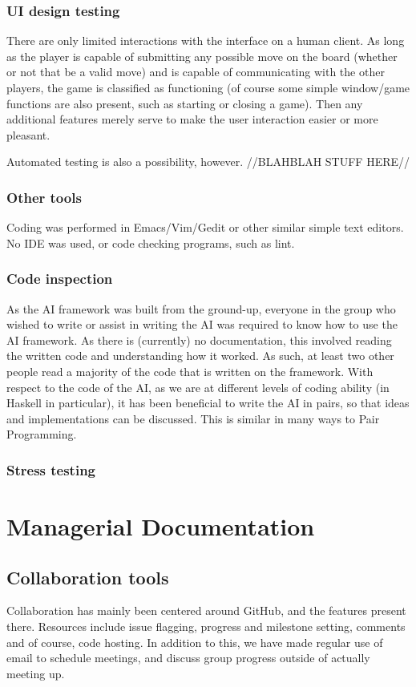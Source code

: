 \documentclass[12pt]{article}
\begin{document}
\subsubsection{UI design testing}
There are only limited interactions with the interface on a human client. As long as the player is capable of submitting any possible move on the board (whether or not that be a valid move) and is capable of communicating with the other players, the game is classified as functioning (of course some simple window/game functions are also present, such as starting or closing a game). Then any additional features merely serve to make the user interaction easier or more pleasant.

Automated testing is also a possibility, however. //BLAHBLAH STUFF HERE//

\subsubsection{Other tools}
Coding was performed in Emacs/Vim/Gedit or other similar simple text editors. No IDE was used, or code checking programs, such as lint.

\subsubsection{Code inspection}
As the AI framework was built from the ground-up, everyone in the group who wished to write or assist in writing the AI was required to know how to use the AI framework. As there is (currently) no documentation, this involved reading the written code and understanding how it worked. As such, at least two other people read a majority of the code that is written on the framework. With respect to the code of the AI, as we are at different levels of coding ability (in Haskell in particular), it has been beneficial to write the AI in pairs, so that ideas and implementations can be discussed. This is similar in many ways to Pair Programming.

\subsubsection{Stress testing}


\section{Managerial Documentation}
\subsection{Collaboration tools}
Collaboration has mainly been centered around GitHub, and the features present there. Resources include issue flagging, progress and milestone setting, comments and of course, code hosting. In addition to this, we have made regular use of email to schedule meetings, and discuss group progress outside of actually meeting up.
\end{document}
